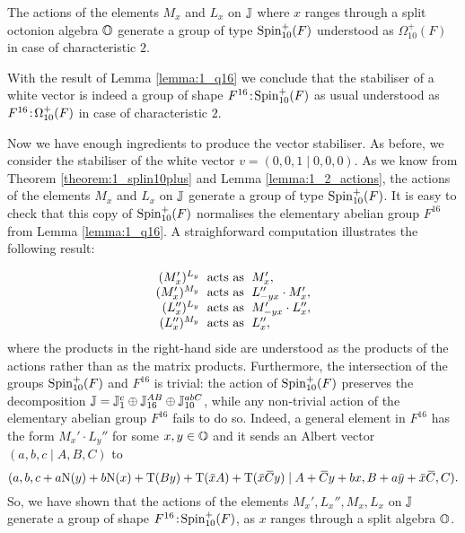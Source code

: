 \begin{theorem}
	\label{theorem:1_splin10plus}
	The actions of the elements $M_x$ and $L_x$ on $\mathbb{J}$ where $x$ ranges through a 
	split octonion algebra $\mathbb{O}$
	generate a group of type $\mathrm{Spin}_{10}^+(F)$ understood as $\Omega_{10}^+(F)$
	in case of characteristic $2$. 
\end{theorem}

With the result of Lemma \ref{lemma:1_q16} we conclude that the stabiliser of a white
vector is indeed a group of shape
$F^{16}\mathord{{\;\!{:}\;\!}}\mathrm{Spin}_{10}^+(F)$ as usual understood as $F^{16}\mathord{{\;\!{:}\;\!}}\Omega_{10}^+(F)$ in case of
characteristic $2$. 

Now we have enough ingredients to produce the vector stabiliser. As before, we consider the stabiliser of the white
    vector $v = (0,0,1\mid 0,0,0)$.
As we know from Theorem \ref{theorem:1_splin10plus} and Lemma \ref{lemma:1_2_actions}, 
the actions of the elements $M_x$ and $L_x$ on $\mathbb{J}$ generate a group of type 
$\mathrm{Spin}_{10}^+(F)$. It is easy to check
 that this copy of $\mathrm{Spin}_{10}^+(F)$ normalises the elementary abelian
group $F^{16}$ from Lemma \ref{lemma:1_q16}. A straighforward computation
illustrates the following result:

\begin{equation}
	\begin{array}{r@{\;}c@{\;}l}
		(M_x')^{L_y} & \text{ acts as } & M_x', \\
		(M_x')^{M_y} & \text{ acts as } &  L_{-yx}'' \cdot M_x', \\
		(L_x'')^{L_y} & \text{ acts as } & M_{-yx}' \cdot L_x'', \\
		(L_x'')^{M_y} & \text{ acts as } & L_x'', \\
	\end{array}
\end{equation}
where the products in the right-hand side are understood as the products of the actions rather
than as the matrix products. Furthermore, the intersection
of the groups $\mathrm{Spin}_{10}^+(F)$ and $F^{16}$ is trivial: the action of $\mathrm{Spin}_{10}^+(F)$
preserves the decomposition $\mathbb{J} = \mathbb{J}_{1}^c \oplus \mathbb{J}_{16}^{AB} \oplus \mathbb{J}_{10}^{abC}$,
while any non-trivial action of the elementary abelian group $F^{16}$ fails to do so.
Indeed, a general element in $F^{16}$ has the form $M_x' \cdot L_y''$ for some $x,y \in 
\mathbb{O}$ and it sends an Albert vector $(a,b,c\mid A,B,C)$ to 
\begin{equation*}
	(a,b,c+a\NN(y)+b\NN(x) + \Tr(By) + \Tr(\ovx A) + \Tr(\ovx \ovC y) \mid
			A+\ovC y + bx, B+a\ovy + \ovx \ovC, C ).
\end{equation*}
So, we have shown that the actions of the elements $M_x', L_x'', M_x, L_x$ on $\mathbb{J}$ generate
a group of shape $F^{16}\mathord{{\;\!{:}\;\!}}\mathrm{Spin}_{10}^+(F)$, as $x$ ranges through a split algebra $\mathbb{O}$.


